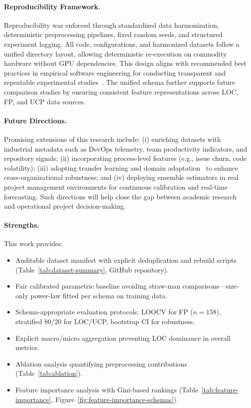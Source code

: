 \documentclass[11pt,a4paper]{article}
\begin{document}
\paragraph{Reproducibility Framework.}
Reproducibility was enforced through standardized data harmonization,
deterministic preprocessing pipelines, fixed random seeds,
and structured experiment logging.
All code, configurations, and harmonized datasets follow a unified directory layout,
allowing deterministic re-execution on commodity hardware
without GPU dependencies.
This design aligns with recommended best practices in empirical software engineering
for conducting transparent and repeatable experimental studies~\cite{cruz2019open,lopez2021empirical}.
The unified schema further supports future comparison studies
by ensuring consistent feature representations across LOC, FP, and UCP data sources.

\paragraph{Future Directions.}
Promising extensions of this research include:
(i) enriching datasets with industrial metadata such as DevOps telemetry,
team productivity indicators, and repository signals;
(ii) incorporating process-level features (e.g., issue churn, code volatility);
(iii) adopting transfer learning and domain adaptation~\cite{yu2021transfer}
to enhance cross-organizational robustness; and
(iv) deploying ensemble estimators in real project management environments
for continuous calibration and real-time forecasting.
Such directions will help close the gap between academic research
and operational project decision-making.

\paragraph{Strengths.}
This work provides:
\begin{itemize}[leftmargin=2em]
    \item Auditable dataset manifest with explicit deduplication and rebuild scripts (Table~\ref{tab:dataset-summary}, GitHub repository).
    \item Fair calibrated parametric baseline avoiding straw-man comparisons—size-only power-law fitted per schema on training data.
    \item Schema-appropriate evaluation protocols: LOOCV for FP ($n=158$), stratified 80/20 for LOC/UCP, bootstrap CI for robustness.
    \item Explicit macro/micro aggregation preventing LOC dominance in overall metrics.
    \item Ablation analysis quantifying preprocessing contributions (Table~\ref{tab:ablation}).
    \item Feature importance analysis with Gini-based rankings (Table~\ref{tab:feature-importance}, Figure~\ref{fig:feature-importance-schemas}).
\end{itemize}
\end{document}
